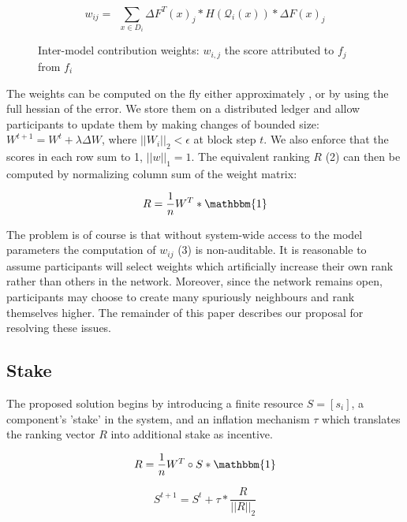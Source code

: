 \documentclass{article}
\begin{document}
\begin{equation}
w_{ij} = \ \ \sum_{x \in D_i} \Delta F^T(x)_j * H(\mathcal{Q}_i(x)) * \Delta F(x)_j
\end{equation}

\begin{figure}[H]
	\centering
	\hspace*{-2cm}
	
	\caption{Inter-model contribution weights: $w_{i,j}$ the score attributed to $f_j$ from $f_i$}
\end{figure}{}

The weights can be computed on the fly either approximately \cite{yu2017nisp}, or by using the full hessian of the error. We store them on a distributed ledger and allow participants to update them by making changes of bounded size: $W^{t+1}= W^t + \lambda \Delta W$, where $||W_i||_2 < \epsilon$ at block step $t$. We also enforce that the scores in each row sum to 1, $||w||_1 = 1$. The equivalent ranking $R$ (2) can then be computed by normalizing column sum of the weight matrix:
\bigskip

\begin{equation}
R = \frac{1}{n} W^T * \mathbbm{1}
\end{equation}

The problem is of course is that without system-wide access to the model parameters the computation of $w_{ij}$ (3) is non-auditable. It is reasonable to assume participants will select weights which artificially increase their own rank rather than others in the network. Moreover, since the network remains open, participants may choose to create many spuriously neighbours and rank themselves higher. The remainder of this paper describes our proposal for resolving these issues.
\bigskip

\subsection{Stake}

The proposed solution begins by introducing a finite resource $ S=[s_i]$, a component's 'stake' in the system, and an inflation mechanism $\tau$ which translates the ranking vector $R$ into additional stake as incentive. 
\bigskip

\begin{equation}
R = \frac{1}{n} W^T \circ S * \mathbbm{1}
\end{equation}

\begin{equation}
S^{t+1} = S^t + \tau * \frac{R}{||R||_2} 
\end{equation}
\end{document}
